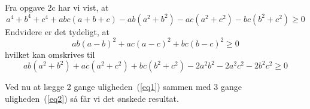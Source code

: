 \documentclass[12pt,oneside,a4paper]{article}
\newcommand{\be}{\begin{equation}}
\newcommand{\ee}{\end{equation}}
\begin{document}
Fra opgave 2c har vi vist, at
\be
a^4+b^4+c^4+abc(a+b+c) - ab(a^2+b^2) - ac(a^2+c^2) - bc(b^2+c^2)  \ge 0
\label{eq1}
\ee
Endvidere er det tydeligt, at 
$$
ab(a-b)^2 + ac(a-c)^2+bc(b-c)^2 \ge 0
$$
hvilket kan omskrives til
\be
ab(a^2+b^2) + ac(a^2+c^2) +bc(b^2+c^2) -2a^2b^2 -2a^2c^2 -2b^2c^2 \ge 0
\label{eq2}
\ee

Ved nu at lægge 2 gange uligheden~(\ref{eq1}) sammen med 3 gange uligheden~(\ref{eq2}) så får vi det ønskede resultat.
\end{document}

